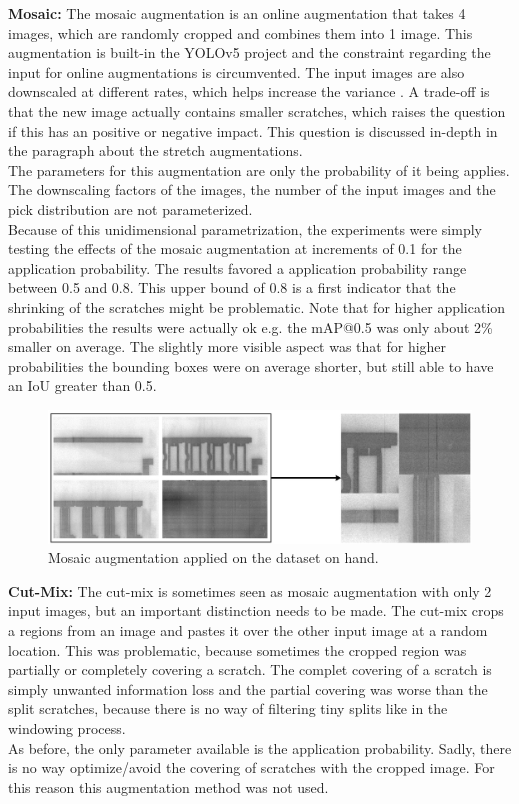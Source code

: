 \textbf{Mosaic:} The mosaic augmentation is an online augmentation that takes 4 images, which are randomly cropped and combines them into 1 image. This augmentation is built-in the YOLOv5 project and the constraint regarding the input for online augmentations is circumvented.
The input images are also downscaled at different rates, which helps increase the variance . A trade-off is that the new image actually contains smaller scratches, which raises the question if this has an positive or negative impact. This question is discussed in-depth in the paragraph about the stretch augmentations. \\
The parameters for this augmentation are only the probability of it being applies. The downscaling factors of the images, the number of the input images and the pick distribution are not parameterized. \\
Because of this unidimensional parametrization, the experiments were simply testing the effects of the mosaic augmentation at increments of 0.1 for the application probability. The results favored a application probability range between 0.5 and 0.8. This upper bound of 0.8 is a first indicator that the shrinking of the scratches might be problematic. Note that for higher application probabilities the results were actually ok e.g. the mAP@0.5 was only about 2\% smaller on average. The slightly more visible aspect was that for higher probabilities the bounding boxes were on average shorter, but still able to have an  IoU greater than 0.5. \\


\begin{figure}[!h]
\centering
\captionsetup{justification=centering,margin=2cm}
\includegraphics[width=0.8\columnwidth]{images/implementation/augmentations/mosaic_example}
\caption{Mosaic augmentation applied on the dataset on hand.}
\label{impl:mosaic}
\end{figure}

\textbf{Cut-Mix:}
The cut-mix is sometimes seen as mosaic augmentation with only 2 input images, but an important distinction needs to be made. The cut-mix crops a regions from an image and pastes it over the other input image at a random location. This was problematic, because sometimes the cropped region was partially or completely covering a scratch. The complet covering of a scratch is simply unwanted information loss and the partial covering was worse than the split scratches, because there is no way of filtering tiny splits like in the windowing process. \\
As before, the only parameter available is the application probability. Sadly, there is no way optimize/avoid the covering of scratches with the cropped image. For this reason this augmentation method was not used. \\

